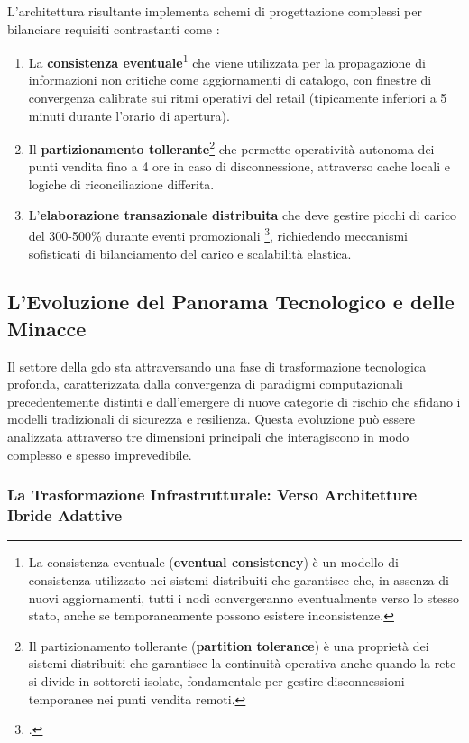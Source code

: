 L'architettura risultante implementa schemi di progettazione complessi per bilanciare requisiti contrastanti come :
\begin{enumerate}
    \item La \textbf{consistenza eventuale}\footnote{La consistenza eventuale (\textbf{eventual consistency}) è un modello di consistenza utilizzato nei sistemi distribuiti che garantisce che, in assenza di nuovi aggiornamenti, tutti i nodi convergeranno eventualmente verso lo stesso stato, anche se temporaneamente possono esistere inconsistenze.} che viene utilizzata per la propagazione di informazioni non critiche come aggiornamenti di catalogo, con finestre di convergenza calibrate sui ritmi operativi del retail (tipicamente inferiori a 5 minuti durante l'orario di apertura).
    \item Il \textbf{partizionamento tollerante}\footnote{Il partizionamento tollerante (\textbf{partition tolerance}) è una proprietà dei sistemi distribuiti che garantisce la continuità operativa anche quando la rete si divide in sottoreti isolate, fondamentale per gestire disconnessioni temporanee nei punti vendita remoti.} che permette operatività autonoma dei punti vendita fino a 4 ore in caso di disconnessione, attraverso cache locali e logiche di riconciliazione differita.
    \item L'\textbf{elaborazione transazionale distribuita} che deve gestire picchi di carico del 300-500\% durante eventi promozionali \footcite{Osservatorio2024}, richiedendo meccanismi sofisticati di bilanciamento del carico e scalabilità elastica.
\end{enumerate}

\subsection{L'Evoluzione del Panorama Tecnologico e delle Minacce}
\label{ssec:evoluzione_tecnologica_minacce}

Il settore della \gls{gdo} sta attraversando una fase di trasformazione tecnologica profonda, caratterizzata dalla convergenza di paradigmi computazionali precedentemente distinti e dall'emergere di nuove categorie di rischio che sfidano i modelli tradizionali di sicurezza e resilienza. Questa evoluzione può essere analizzata attraverso tre dimensioni principali che interagiscono in modo complesso e spesso imprevedibile.

\subsubsection{La Trasformazione Infrastrutturale: Verso Architetture Ibride Adattive}

